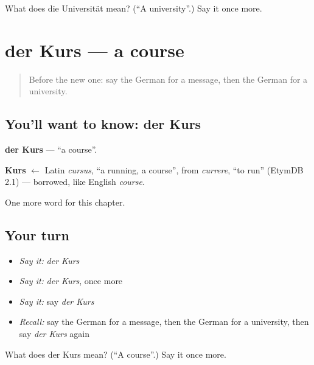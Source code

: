 \begin{tcolorbox}[breakable,colback=teal!4,colframe=teal!35!black,title={Before you move on}]
What does die Universität mean? (\textquotedblleft{}A university\textquotedblright{}.) Say it once more.
\end{tcolorbox}
\section[der Kurs]{der Kurs — a course}

\label{lesson:GE-C160-kurs}



\begin{quote}
Before the new one: say the German for a message, then the German for a university.
\end{quote}

\subsection*{You'll want to know: der Kurs}
\textbf{der Kurs} — \textquotedblleft{}a course\textquotedblright{}.

\begin{cousinweb}
\textbf{Kurs} $\leftarrow$ Latin \emph{cursus}, \textquotedblleft{}a running, a course\textquotedblright{}, from \emph{currere}, \textquotedblleft{}to run\textquotedblright{} (EtymDB 2.1) — borrowed, like English \emph{course}.
\end{cousinweb}

\begin{grammarlens}[title={What you've built}]
One more word for this chapter.
\end{grammarlens}

\subsection*{Your turn}
\begin{itemize}
\raggedright
  \item \emph{Say it:} \emph{der Kurs}
  \item \emph{Say it:} \emph{der Kurs}, once more
  \item \emph{Say it:} say \emph{der Kurs}
  \item \emph{Recall:} say the German for a message, then the German for a university, then say \emph{der Kurs} again
\end{itemize}

\begin{tcolorbox}[breakable,colback=teal!4,colframe=teal!35!black,title={Before you move on}]
What does der Kurs mean? (\textquotedblleft{}A course\textquotedblright{}.) Say it once more.
\end{tcolorbox}
